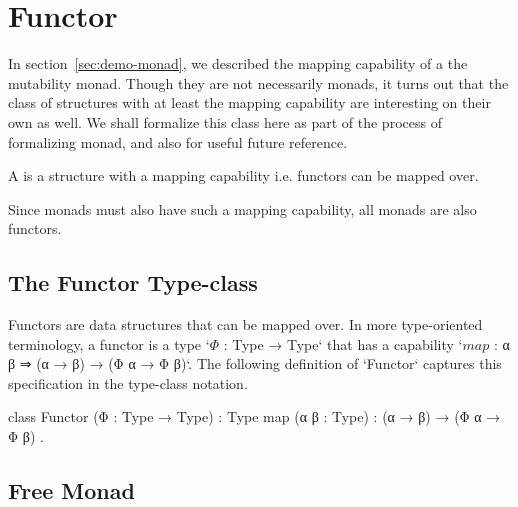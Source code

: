 \section{Functor}
\label{sec:definition-of-functor}

In section~\ref{sec:demo-monad}, we described the mapping capability of a the mutability monad.
Though they are not necessarily monads, it turns out that the class of structures with at least the mapping capability are interesting on their own as well.
We shall formalize this class here as part of the process of formalizing monad, and also for useful future reference.
\begin{blockdefinition}
A  is a structure with a mapping capability i.e. functors can be mapped over.
\end{blockdefinition}
Since monads must also have such a mapping capability, all monads are also functors.

\subsection{The Functor Type-class}
\label{sec:functor-type-class}

Functors are data structures that can be mapped over.
In more type-oriented terminology, a functor is a type \code`$Φ$ : Type → Type` that has a capability \code`$map$ : α β ⇒ (α → β) → (Φ α → Φ β)`.
The following definition of \code`Functor` captures this specification in the type-class notation.
\begin{program}[caption={Definition of the type-class \code|Functor|}]
class Functor (Φ : Type → Type) : Type
  { map (α β : Type) : (α → β) → (Φ α → Φ β) }.
\end{program}

\subsection{Free Monad}


